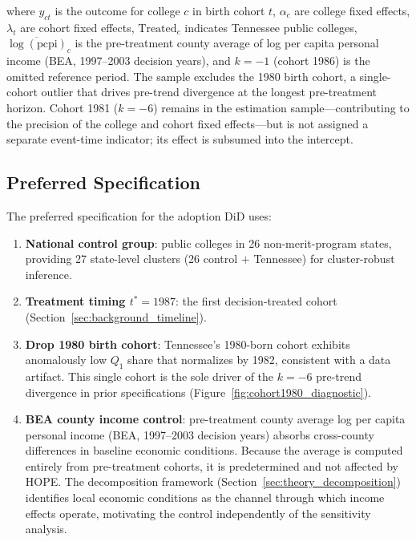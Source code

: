 \noindent where $y_{ct}$ is the outcome for college $c$ in birth cohort
$t$, $\alpha_c$ are college fixed effects, $\lambda_t$ are cohort fixed
effects, $\text{Treated}_c$ indicates Tennessee public colleges,
$\overline{\log(\text{pcpi})}_{c}$ is the pre-treatment county average
of log per capita personal income (BEA, 1997--2003 decision years),
and $k = -1$ (cohort 1986) is the omitted reference period. The sample
excludes the 1980 birth cohort, a single-cohort outlier that drives
pre-trend divergence at the longest pre-treatment horizon. Cohort 1981
($k = -6$) remains in the estimation sample---contributing to the
precision of the college and cohort fixed effects---but is not assigned
a separate event-time indicator; its effect is subsumed into the
intercept.

\subsection{Preferred Specification}

The preferred specification for the adoption DiD uses:
\begin{enumerate}
  \item \textbf{National control group}: public colleges in 26
    non-merit-program states, providing 27 state-level clusters
    (26 control $+$ Tennessee) for cluster-robust inference.
  \item \textbf{Treatment timing $t^* = 1987$}: the first
    decision-treated cohort
    (Section~\ref{sec:background_timeline}).
  \item \textbf{Drop 1980 birth cohort}: Tennessee's 1980-born cohort
    exhibits anomalously low $Q_1$ share that normalizes by 1982,
    consistent with a data artifact. This single cohort is the sole
    driver of the $k = -6$ pre-trend divergence in prior
    specifications (Figure~\ref{fig:cohort1980_diagnostic}).
  \item \textbf{BEA county income control}: pre-treatment county
    average log per capita personal income (BEA, 1997--2003 decision
    years) absorbs cross-county differences in baseline economic
    conditions. Because the average is computed entirely from
    pre-treatment cohorts, it is predetermined and not affected by
    HOPE. The decomposition framework
    (Section~\ref{sec:theory_decomposition}) identifies local
    economic conditions as the channel through which income effects
    operate, motivating the control independently of the sensitivity
    analysis.
\end{enumerate}

